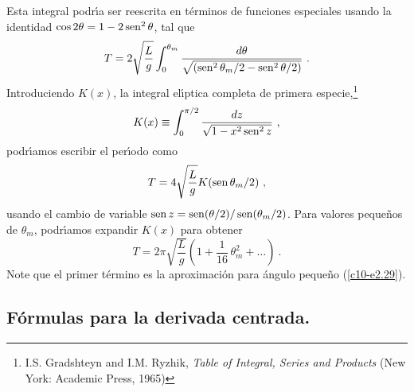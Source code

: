 Esta integral podr{\'\i}a ser reescrita en t{\'e}rminos de funciones especiales
usando la identidad $\cos 2\theta=1-2\operatorname{sen}^2 \theta$, tal que 
\begin{equation}
\label{c10-e2.35}
T=2\sqrt{\frac Lg } \int_0^{\theta_m}\frac{d\theta}{\sqrt{\left ( \operatorname{sen}^2
      \theta_m/2 -\operatorname{sen}^2 \theta/2\right  )}}\ .
\end{equation} 
Introduciendo $K(x)$, la integral el{\'\i}ptica completa de primera
especie,\footnote{I.S. Gradshteyn and I.M. Ryzhik, {\em Table of
    Integral, Series and Products} (New York: Academic Press, 1965)}
\begin{equation}
\label{c10-e2.36}
K(x)\equiv\int_0^{\pi/2} \frac{dz}{\sqrt{1-x^2\operatorname{sen}^2 z}}\ ,
\end{equation}
podr{\'\i}amos escribir el per{\'\i}odo como 
\begin{equation}
\label{c10-e2.37}
T=4\sqrt{\frac{L}{g}} K(\operatorname{sen} \theta_m/2 )\ ,
\end{equation}
usando el cambio de variable $\operatorname{sen} z= \operatorname{sen}( \theta/2)/ \operatorname{sen}(\theta_m/2)$. Para
valores peque{\~n}os de $\theta_m$, podr{\'\i}amos expandir $K(x)$ para obtener
\begin{equation}
\label{c10-e2.38}
T=2\pi \sqrt{\frac{L}{g} }\left ( 1 + \frac{1}{16}\,  \theta^2_m + \ldots \right
)\ .
\end{equation}
Note que el primer t{\'e}rmino es la aproximaci{\'o}n para {\'a}ngulo peque{\~n}o
(\ref{c10-e2.29}). 

\subsection{F{\'o}rmulas para la derivada centrada.}

